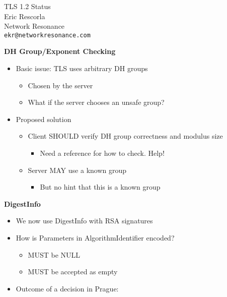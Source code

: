 \documentclass[helvetica,fancybox,landscape]{seminar}
\newcommand{\heading}[1]{%
  \begin{center} 
    \large\bf 
    #1 
  \end{center} 
  \vspace{.4 in}}
\begin{document}
\begin{slide}
\begin{center}
\LARGE{{\bf}TLS 1.2 Status}\\

\vspace{.3 in}
\large{Eric Rescorla}\\
\large{Network Resonance}\\
\large{\texttt{ekr@networkresonance.com}}

\end{center}
\end{slide}


\begin{slide}
\heading{DH Group/Exponent Checking}

\begin{itemize}
\item Basic issue: TLS uses arbitrary DH groups
\begin{itemize}
\item Chosen by the server
\item What if the server chooses an unsafe group?
\end{itemize}
\item Proposed solution
\begin{itemize}
\item Client SHOULD verify DH group correctness and modulus size
\begin{itemize}
\item Need a reference for how to check. Help!
\end{itemize}
\item Server MAY use a known group
\begin{itemize}
\item But no hint that this is a known group
\end{itemize}
\end{itemize}
\end{itemize}
\end{slide}



\begin{slide}
\heading{DigestInfo}

\begin{itemize}
\item We now use DigestInfo with RSA signatures
\item How is Parameters in AlgorithmIdentifier encoded?
\begin{itemize}
\item MUST be NULL
\item MUST be accepted as empty
\\\end{itemize}
\item Outcome of a decision in Prague:
\end{itemize}
\end{slide}
\end{document}
